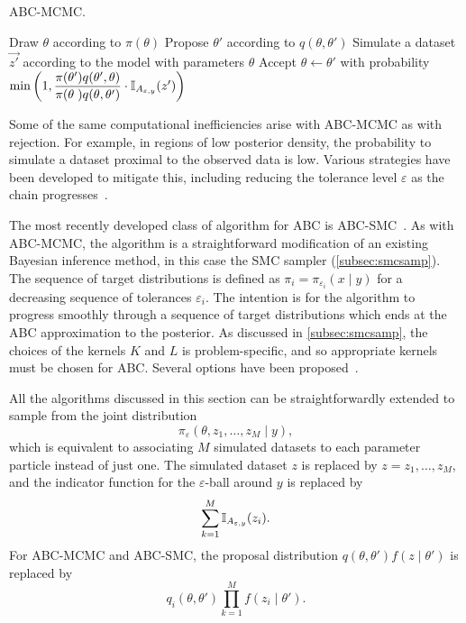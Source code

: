 \begin{algorithm}
  \caption{\gls{ABC}-\gls{MCMC}.}
  \begin{algorithmic}
    \State Draw $\theta$ according to $\pi(\theta)$
    \Loop
      \State Propose $\theta'$ according to $q(\theta, \theta')$
      \State Simulate a dataset $\vec{z'}$ according to the model with
             parameters $\theta$
      \State Accept $\theta \gets \theta'$ with probability
      $\min \left( 1, 
       \dfrac{\pi(\theta') q(\theta', \theta)}
             {\pi(\theta\phantom{'}) q(\theta, \theta')} 
       \cdot \mathbb{I}_{A_{\varepsilon, y}}(z') \right)$
    \EndLoop
  \end{algorithmic}
  \label{alg:abcmcmc}
\end{algorithm}

Some of the same computational inefficiencies arise with \gls{ABC}-\gls{MCMC}
as with rejection. For example, in regions of low posterior density, the
probability to simulate a dataset proximal to the observed data is low. Various
strategies have been developed to mitigate this, including reducing the
tolerance level $\varepsilon$ as the chain
progresses~\autocite{ratmann2007using}.

The most recently developed class of algorithm for \gls{ABC} is
\gls{ABC}-\gls{SMC}~\autocite{sisson2007sequential, beaumont2009adaptive}. As
with \gls{ABC}-\gls{MCMC}, the algorithm is a straightforward modification of
an existing Bayesian inference method, in this case the \gls{SMC} sampler
(\cref{subsec:smcsamp}). The sequence of target distributions is defined as
$\pi_i = \pi_{\varepsilon_i}(x \mid y)$ for a decreasing sequence of tolerances
$\varepsilon_i$. The intention is for the algorithm to progress smoothly
through a sequence of target distributions which ends at the \gls{ABC}
approximation to the posterior. As discussed in \cref{subsec:smcsamp}, the
choices of the kernels $K$ and $L$ is problem-specific, and so appropriate
kernels must be chosen for \gls{ABC}. Several options have been
proposed~\autocite{beaumont2009adaptive, sisson2007sequential,
del2012adaptive}.

All the algorithms discussed in this section can be straightforwardly extended
to sample from the joint distribution
\[
  \pi_\varepsilon(\theta, z_1, \ldots, z_M \mid y),
\]
which is equivalent to associating $M$ simulated datasets to each parameter
particle instead of just one. The simulated dataset $z$ is replaced by
$z = z_1, \ldots, z_M$, and the indicator function for the
$\varepsilon$-ball around $y$ is replaced by
\[
  \sum_{k=1}^M \mathbb{I}_{A_{\varepsilon, y}} (z_i).
\]
For \gls{ABC}-\gls{MCMC} and \gls{ABC}-\gls{SMC}, the proposal distribution
$q(\theta, \theta') f(z \mid \theta')$ is replaced by
\[
  q_i(\theta, \theta') \prod_{k=1}^M f(z_i \mid \theta').
\]

